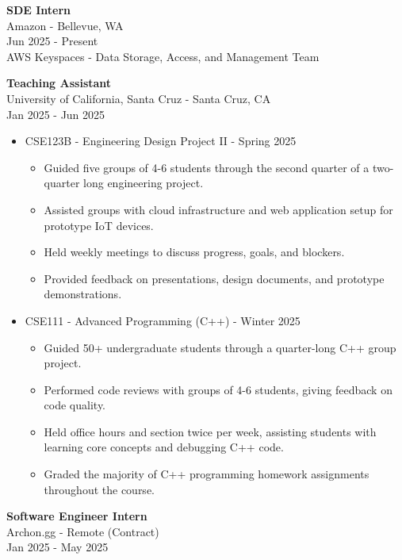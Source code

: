 \documentclass[a4paper,10pt]{article}
\begin{document}
\begin{flushleft}
  \textbf{SDE Intern} \\
  Amazon - Bellevue, WA \\
  Jun 2025 - Present \\
  AWS Keyspaces - Data Storage, Access, and Management Team
\end{flushleft}

\begin{flushleft}
  \textbf{Teaching Assistant} \\
  University of California, Santa Cruz - Santa Cruz, CA \\
  Jan 2025 - Jun 2025
  \begin{itemize}
    \item CSE123B - Engineering Design Project II - Spring 2025
      \begin{itemize}
        \item Guided five groups of 4-6 students through the second quarter of a two-quarter long engineering project.
        \item Assisted groups with cloud infrastructure and web application setup for prototype IoT devices.
        \item Held weekly meetings to discuss progress, goals, and blockers.
        \item Provided feedback on presentations, design documents, and prototype demonstrations.
      \end{itemize}
    \item CSE111 - Advanced Programming (C++) - Winter 2025
      \begin{itemize}
        \item Guided 50+ undergraduate students through a quarter-long C++ group project.
        \item Performed code reviews with groups of 4-6 students, giving feedback on code quality.
        \item Held office hours and section twice per week, assisting students with learning core concepts and debugging C++ code.
        \item Graded the majority of C++ programming homework assignments throughout the course.
      \end{itemize}
  \end{itemize}
\end{flushleft}

\begin{flushleft}
  \textbf{Software Engineer Intern} \\
  Archon.gg - Remote (Contract) \\
  Jan 2025 - May 2025
\end{flushleft}
\end{document}

